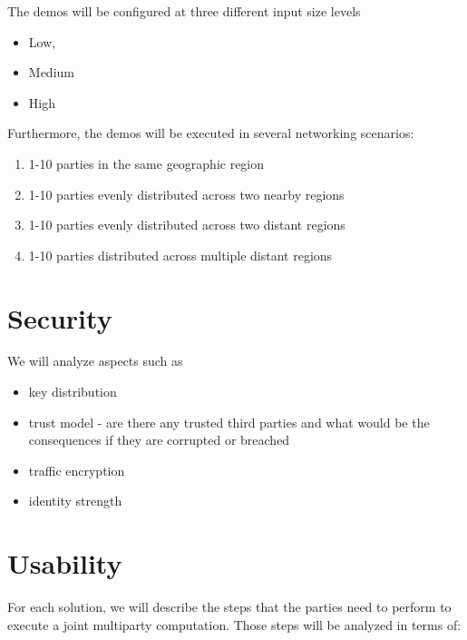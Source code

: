 The demos will be configured at three different input size levels

\begin{itemize}
\tightlist
\item
  Low,
\item
  Medium
\item
  High
\end{itemize}

Furthermore, the demos will be executed in several networking scenarios:

\begin{enumerate}
\def\labelenumi{\arabic{enumi}.}
\tightlist
\item
  1-10 parties in the same geographic region
\item
  1-10 parties evenly distributed across two nearby regions
\item
  1-10 parties evenly distributed across two distant regions
\item
  1-10 parties distributed across multiple distant regions
\end{enumerate}

\hypertarget{security}{%
\section{Security}\label{security}}

We will analyze aspects such as

\begin{itemize}
\tightlist
\item
  key distribution
\item
  trust model - are there any trusted third parties and what would be
  the consequences if they are corrupted or breached
\item
  traffic encryption
\item
  identity strength
\end{itemize}

\hypertarget{usability}{%
\section{Usability}\label{usability}}

For each solution, we will describe the steps that the parties need to
perform to execute a joint multiparty computation. Those steps will be
analyzed in terms of:

